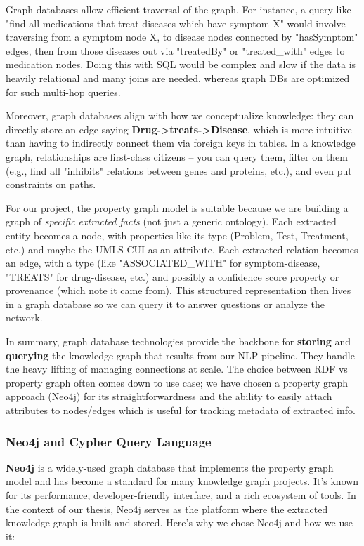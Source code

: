 Graph databases allow efficient traversal of the graph. For instance, a query like "find all medications that treat diseases which have symptom X" would involve traversing from a symptom node X, to disease nodes connected by "hasSymptom" edges, then from those diseases out via "treatedBy" or "treated\_with" edges to medication nodes. Doing this with SQL would be complex and slow if the data is heavily relational and many joins are needed, whereas graph DBs are optimized for such multi-hop queries.

Moreover, graph databases align with how we conceptualize knowledge: they can directly store an edge saying \textbf{Drug->treats->Disease}, which is more intuitive than having to indirectly connect them via foreign keys in tables. In a knowledge graph, relationships are first-class citizens – you can query them, filter on them (e.g., find all "inhibits" relations between genes and proteins, etc.), and even put constraints on paths.

For our project, the property graph model is suitable because we are building a graph of \emph{specific extracted facts} (not just a generic ontology). Each extracted entity becomes a node, with properties like its type (Problem, Test, Treatment, etc.) and maybe the UMLS CUI as an attribute. Each extracted relation becomes an edge, with a type (like "ASSOCIATED\_WITH" for symptom-disease, "TREATS" for drug-disease, etc.) and possibly a confidence score property or provenance (which note it came from). This structured representation then lives in a graph database so we can query it to answer questions or analyze the network.

In summary, graph database technologies provide the backbone for \textbf{storing} and \textbf{querying} the knowledge graph that results from our NLP pipeline. They handle the heavy lifting of managing connections at scale. The choice between RDF vs property graph often comes down to use case; we have chosen a property graph approach (Neo4j) for its straightforwardness and the ability to easily attach attributes to nodes/edges which is useful for tracking metadata of extracted info.

\subsubsection{Neo4j and Cypher Query Language}

\textbf{Neo4j} is a widely-used graph database that implements the property graph model and has become a standard for many knowledge graph projects. It's known for its performance, developer-friendly interface, and a rich ecosystem of tools. In the context of our thesis, Neo4j serves as the platform where the extracted knowledge graph is built and stored. Here's why we chose Neo4j and how we use it:

